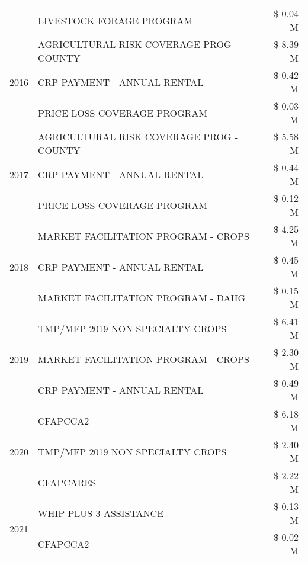 \begin{tabular}{llr}
 & LIVESTOCK FORAGE PROGRAM & \$ 0.04 M \\
\cline{1-3}
\multirow[t]{3}{*}{2016} & AGRICULTURAL RISK COVERAGE PROG - COUNTY      & \$ 8.39 M \\
 & CRP PAYMENT - ANNUAL RENTAL                   & \$ 0.42 M \\
 & PRICE LOSS COVERAGE PROGRAM                   & \$ 0.03 M \\
\cline{1-3}
\multirow[t]{3}{*}{2017} & AGRICULTURAL RISK COVERAGE PROG - COUNTY & \$ 5.58 M \\
 & CRP PAYMENT - ANNUAL RENTAL & \$ 0.44 M \\
 & PRICE LOSS COVERAGE PROGRAM & \$ 0.12 M \\
\cline{1-3}
\multirow[t]{3}{*}{2018} & MARKET FACILITATION PROGRAM - CROPS & \$ 4.25 M \\
 & CRP PAYMENT - ANNUAL RENTAL & \$ 0.45 M \\
 & MARKET FACILITATION PROGRAM - DAHG & \$ 0.15 M \\
\cline{1-3}
\multirow[t]{3}{*}{2019} & TMP/MFP 2019 NON SPECIALTY CROPS & \$ 6.41 M \\
 & MARKET FACILITATION PROGRAM - CROPS & \$ 2.30 M \\
 & CRP PAYMENT - ANNUAL RENTAL & \$ 0.49 M \\
\cline{1-3}
\multirow[t]{3}{*}{2020} & CFAPCCA2 & \$ 6.18 M \\
 & TMP/MFP 2019 NON SPECIALTY CROPS & \$ 2.40 M \\
 & CFAPCARES & \$ 2.22 M \\
\cline{1-3}
\multirow[t]{2}{*}{2021} & WHIP PLUS 3 ASSISTANCE & \$ 0.13 M \\
 & CFAPCCA2 & \$ 0.02 M \\
\cline{1-3}
\bottomrule
\end{tabular}
